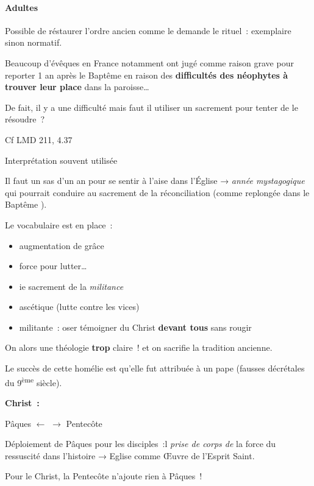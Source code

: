 \hypertarget{adultes}{%
\paragraph{Adultes}\label{adultes}}

Possible de réstaurer l'ordre ancien comme le demande le rituel~:
exemplaire sinon normatif.

Beaucoup d'évêques en France notamment ont jugé comme raison grave pour
reporter 1 an après le Baptême en raison des \textbf{difficultés des
néophytes à trouver leur place} dans la paroisse\ldots{}

De fait, il y a une difficulté mais faut il utiliser un sacrement pour
tenter de le résoudre~?

Cf LMD 211, 4.37

Interprétation souvent utilisée

Il faut un sas d'un an pour se sentir à l'aise dans l'Église →
\emph{année mystagogique} qui pourrait conduire au sacrement de la
réconciliation (comme replongée dans le Baptême ).

Le vocabulaire est en place~:

\begin{itemize}
\item
  augmentation de grâce
\item
  force pour lutter\ldots{}
\item
  ie sacrement de la \emph{militance}
\item
   
  ascétique (lutte contre les vices)
   
\item
   
  militante~: oser témoigner du Christ \textbf{devant tous} sans rougir
   
\end{itemize}

On alors une théologie \textbf{trop} claire~! et on sacrifie la
tradition ancienne.

Le succès de cette homélie est qu'elle fut attribuée à un pape (fausses
décrétales du 9\textsuperscript{ème} siècle).

\textbf{Christ~:}

Pâques $\leftarrow$ $\rightarrow$ Pentecôte

Déploiement de Pâques pour les disciples~:l \emph{prise de corps de} la
force du ressuscité dans l'histoire → Eglise comme Œuvre de l'Esprit
Saint.

Pour le Christ, la Pentecôte n'ajoute rien à Pâques~!

